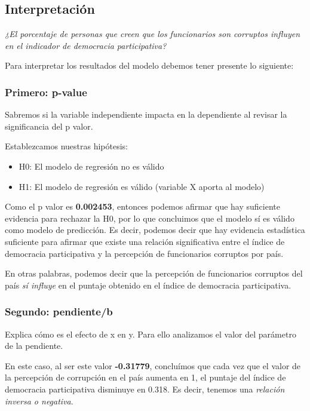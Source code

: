 \documentclass[
]{article}
\begin{document}
\hypertarget{interpretaciuxf3n}{%
\subsection{Interpretación}\label{interpretaciuxf3n}}

\emph{¿El porcentaje de personas que creen que los funcionarios son
corruptos influyen en el indicador de democracia participativa?}

Para interpretar los resultados del modelo debemos tener presente lo
siguiente:

\hypertarget{primero-p-value}{%
\subsubsection{Primero: p-value}\label{primero-p-value}}

Sabremos si la variable independiente impacta en la dependiente al
revisar la significancia del p valor.

Establezcamos nuestras hipótesis:

\begin{itemize}
\item
  H0: El modelo de regresión no es válido
\item
  H1: El modelo de regresión es válido (variable X aporta al modelo)
\end{itemize}

Como el p valor es \textbf{0.002453}, entonces podemos afirmar que hay
suficiente evidencia para rechazar la H0, por lo que concluimos que el
modelo sí es válido como modelo de predicción. Es decir, podemos decir
que hay evidencia estadística suficiente para afirmar que existe una
relación significativa entre el índice de democracia participativa y la
percepción de funcionarios corruptos por país.

En otras palabras, podemos decir que la percepción de funcionarios
corruptos del país \emph{sí influye} en el puntaje obtenido en el índice
de democracia participativa.

\hypertarget{segundo-pendienteb}{%
\subsubsection{Segundo: pendiente/b}\label{segundo-pendienteb}}

Explica cómo es el efecto de x en y. Para ello analizamos el valor del
parámetro de la pendiente.

En este caso, al ser este valor \textbf{-0.31779}, concluímos que cada
vez que el valor de la percepción de corrupción en el país aumenta en 1,
el puntaje del índice de democracia participativa disminuye en 0.318. Es
decir, tenemos una \emph{relación inversa o negativa}.
\end{document}

